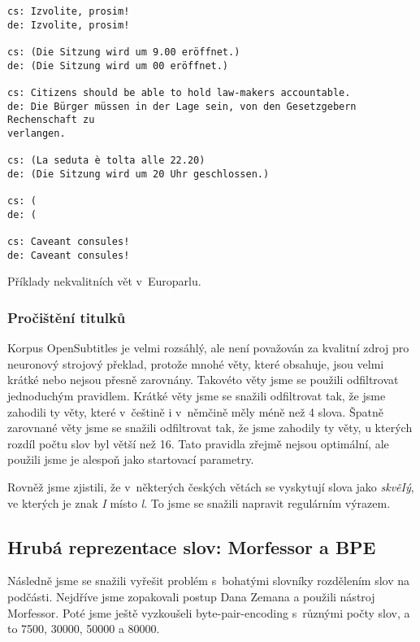 \documentclass[a4]{article}
\begin{document}
\begin{table}[ht]
\begin{verbatim}
cs: Izvolite, prosim!
de: Izvolite, prosim!

cs: (Die Sitzung wird um 9.00 eröffnet.)
de: (Die Sitzung wird um 00 eröffnet.)

cs: Citizens should be able to hold law-makers accountable.
de: Die Bürger müssen in der Lage sein, von den Gesetzgebern Rechenschaft zu
verlangen.

cs: (La seduta è tolta alle 22.20)
de: (Die Sitzung wird um 20 Uhr geschlossen.)

cs: (
de: (

cs: Caveant consules!
de: Caveant consules!
\end{verbatim}
\caption{Příklady nekvalitních vět v~Europarlu.}
\label{tab:europarl}
\end{table}

\subsubsection{Pročištění titulků}

Korpus OpenSubtitles je velmi rozsáhlý, ale není považován za kvalitní
zdroj pro neuronový strojový překlad, protože mnohé věty, které obsahuje,
jsou velmi krátké nebo nejsou přesně zarovnány. Takovéto věty jsme se
použili odfiltrovat jednoduchým pravidlem. Krátké věty jsme se snažili
odfiltrovat tak, že jsme zahodili ty věty, které v~češtině i v~němčině měly
méně než 4 slova. Špatně zarovnané věty jsme se snažili odfiltrovat tak, že
jsme zahodily ty věty, u kterých rozdíl počtu slov byl větší než 16. Tato
pravidla zřejmě nejsou optimální, ale použili jsme je alespoň jako
startovací parametry.

Rovněž jsme zjistili, že v~některých českých větách se vyskytují slova jako
{\it skvěIý}, ve kterých je znak {\it I} místo {\it l}. To jsme se snažili
napravit regulárním výrazem.

\subsection{Hrubá reprezentace slov: Morfessor a BPE}

Následně jsme se snažili vyřešit problém s~bohatými slovníky rozdělením
slov na podčásti. Nejdříve jsme zopakovali postup Dana Zemana a použili
nástroj Morfessor\cite{morfessor}. Poté jsme ještě vyzkoušeli
byte-pair-encoding s~různými počty slov, a to 7500, 30000, 50000 a 80000.
\end{document}
